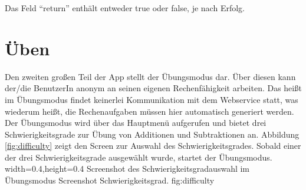 Das Feld \enquote{return} enthält entweder true oder false, je nach Erfolg.


\section{Üben}
\label{sec:excercise}

Den zweiten großen Teil der App stellt der Übungsmodus dar. Über diesen kann der/die BenutzerIn 
anonym an seinen eigenen Rechenfähigkeit arbeiten. Das heißt im Übungsmodus findet keinerlei
Kommunikation mit dem Webservice statt, was wiederum heißt, die Rechenaufgaben müssen hier
automatisch generiert werden. Der Übungsmodus wird über das Hauptmenü aufgerufen 
und bietet drei Schwierigkeitsgrade zur Übung von Additionen und Subtraktionen an. 
Abbildung \ref{fig:difficulty} zeigt den Screen zur Auswahl des Schwierigkeitsgrades. Sobald einer 
der drei Schwierigkeitsgrade ausgewählt wurde, startet der Übungsmodus.
  {width=0.4\textwidth,height=0.4\textheight}%
  {Screenshot des Schwierigkeitsgradauswahl im Übungsmodus}%
  {Screenshot Schwierigkeitsgrad.}%
  {fig:difficulty}%

